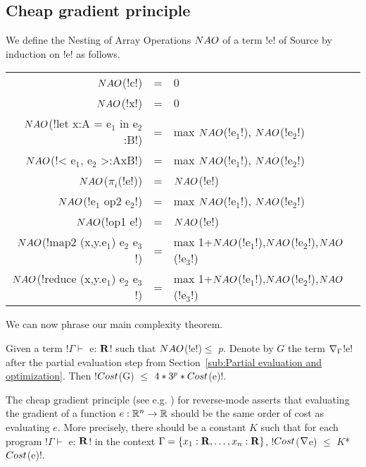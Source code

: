 

\subsection{Cheap gradient principle}

We define the Nesting of Array Operations $NAO$ of a term !e! of Source by induction on !e! as follows.

\begin{tabular}{r c l}
    $NAO$(!c!) &=& 0 \\
    $NAO$(!x!) &=& 0 \\
    $NAO$(!let x:A = e$_1$ in e$_2$:B!) &=& max $NAO$(!e$_1$!), $NAO$(!e$_2$!)  \\ 
    $NAO$(!< e$_1$, e$_2$ >:AxB!) &=& max $NAO$(!e$_1$!), $NAO$(!e$_2$!) \\ 
    $NAO$($\pi_i$(!e!)) &=& $NAO$(!e!)\\
    $NAO$(!e$_1$ op2 e$_2$!) &=& max $NAO$(!e$_1$!), $NAO$(!e$_2$!)\\
    $NAO$(!op1 e!) &=& $NAO$(!e!) \\
    $NAO$(!map2 (x,y.e$_1$) e$_2$ e$_3$!) &=& max 1+$NAO$(!e$_1$!),$NAO$(!e$_2$!),$NAO$(!e$_3$!) \\
    $NAO$(!reduce (x,y.e$_1$) e$_2$ e$_3$!) &=& max 1+$NAO$(!e$_1$!),$NAO$(!e$_2$!),$NAO$(!e$_3$!) \\
\end{tabular}

We can now phrase our main complexity theorem.

\begin{theorem}
    \label{thm:complexity}
    Given a term !$\Gamma \vdash$ e: $\mathbf{R}$! such that $NAO$(!e!)$\leq$ $p$.
    Denote by $G$ the term $\nabla_\Gamma$!e! after the partial evaluation step from Section~\ref{sub:Partial evaluation and optimization}.
    Then !$Cost$(G) $\leq$ $4*3^{p}*Cost$(e)!.
\end{theorem}

The cheap gradient principle (see e.g. \cite{griewank2008evaluating}) for reverse-mode
asserts that evaluating the gradient of a function $e:\mathbb{R}^n\to\mathbb{R}$ 
should be the same order of cost as evaluating $e$. 
More precisely, there should be a constant $K$ such that for each program !$\Gamma \vdash$ e: $\mathbf{R}$! in the context $\Gamma=\{x_1:\mathbf{R},\ldots,x_n:\mathbf{R}\}$,
!$Cost$($\nabla$e) $\leq$ $K$*$Cost$(e)!.

